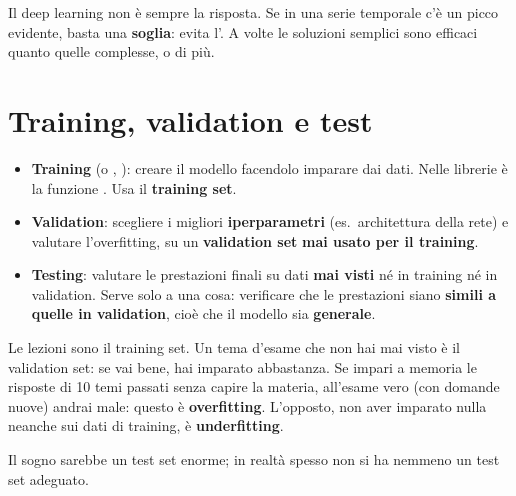 \begin{esame}
Il deep learning non è sempre la risposta. Se in una serie temporale c'è un picco evidente, basta una
\textbf{soglia}: evita l'. A volte le soluzioni semplici sono efficaci quanto quelle
complesse, o di più.
\end{esame}

\section{Training, validation e test}
\begin{definizione}
\begin{itemize}
  \item \textbf{Training} (o , ): creare il modello facendolo imparare dai dati.
        Nelle librerie è la funzione . Usa il \textbf{training set}.
  \item \textbf{Validation}: scegliere i migliori \textbf{iperparametri} (es.\ architettura della rete)
        e valutare l'overfitting, su un \textbf{validation set} \textbf{mai usato per il training}.
  \item \textbf{Testing}: valutare le prestazioni finali su dati \textbf{mai visti} né in training né in
        validation. Serve solo a una cosa: verificare che le prestazioni siano \textbf{simili a quelle in
        validation}, cioè che il modello sia \textbf{generale}.
\end{itemize}
\end{definizione}

\begin{esempio}
Le lezioni sono il training set. Un tema d'esame che non hai mai visto è il validation set: se vai bene,
hai imparato abbastanza. Se impari a memoria le risposte di 10 temi passati senza capire la materia,
all'esame vero (con domande nuove) andrai male: questo è \textbf{overfitting}. L'opposto,
non aver imparato nulla neanche sui dati di training, è \textbf{underfitting}.
\end{esempio}

Il sogno sarebbe un test set enorme; in realtà spesso non si ha nemmeno un test set adeguato.

